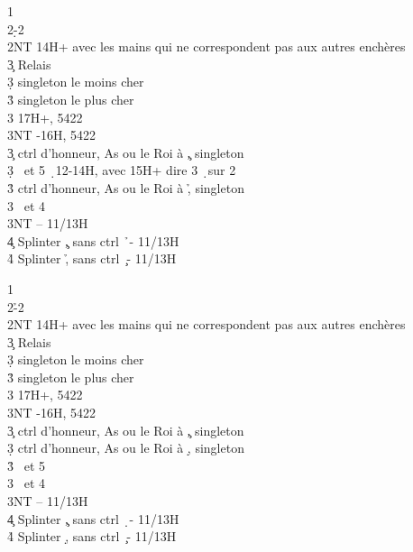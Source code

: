 \documentclass[a4paper]{article}
\begin{document}
\begin{bidtable}
1\c\\
2\d-2\s\\
2NT \> 14H+ avec les mains qui ne correspondent pas aux autres enchères\+\\
3\c \> Relais\+\\
3\d \> singleton le moins cher\\
3\h \> singleton le plus cher\\
3\s \> 17H+, 5422\\
3NT -16H, 5422\-\-\\
3\c \> ctrl d’honneur, As ou le Roi à \c , singleton \h \\
3\d {} \s\ et 5 \d\ 12-14H, avec 15H+ dire 3 \d\ sur 2 \c \\
3\h \> ctrl d’honneur, As ou le Roi à \h , singleton \c \\
3\s {} \s\ et 4 \d \\
3NT  – 11/13H\\
4\c \> Splinter \c , sans ctrl \h\ - 11/13H\\
4\h \> Splinter \h , sans ctrl \c\ - 11/13H
\end{bidtable}

\begin{bidtable}
1\c\\
2\h-2\s\\
2NT \> 14H+ avec les mains qui ne correspondent pas aux autres enchères\+\\
3\c \> Relais\+\\
3\d \> singleton le moins cher\\
3\h \> singleton le plus cher\\
3\s \> 17H+, 5422\\
3NT -16H, 5422\-\-\\
3\c \> ctrl d’honneur, As ou le Roi à \c , singleton \d \\
3\d \> ctrl d’honneur, As ou le Roi à \d , singleton \c \\
3\h {} \s\ et 5 \h \\
3\s {} \s\ et 4 \h \\
3NT  – 11/13H\\
4\c \> Splinter \c , sans ctrl \d\ - 11/13H\\
4\h \> Splinter \d , sans ctrl \c\ - 11/13H
\end{bidtable}
\end{document}
